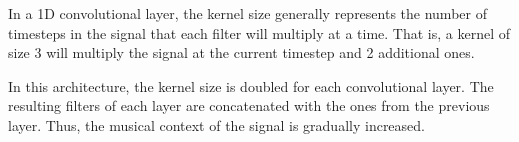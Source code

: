 
In a 1D convolutional layer, the kernel size
generally represents the number of timesteps in the signal
that each filter will multiply at a time. That is, a kernel
of size $3$ will multiply the signal at the current timestep
and 2 additional ones.

In this architecture, the kernel size is doubled for each
convolutional layer. The resulting filters of each layer are
concatenated with the ones from the previous layer. Thus,
the musical context of the signal is gradually increased.
